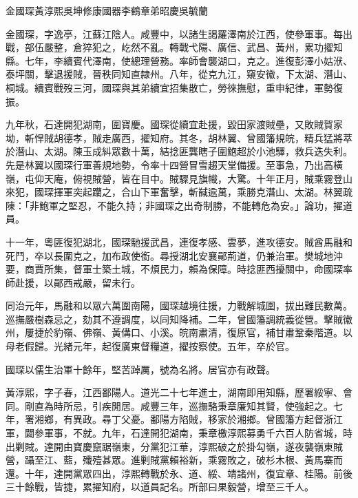 
\begin{pinyinscope}
金國琛黃淳熙吳坤修康國器李鶴章弟昭慶吳毓蘭

金國琛，字逸亭，江蘇江陰人。咸豐中，以諸生謁羅澤南於江西，使參軍事。每出戰，部伍嚴整，倉猝犯之，屹然不亂。轉戰弋陽、廣信、武昌、黃州，累功擢知縣。七年，李續賓代澤南，使總理營務。率師會襲湖口，克之。進復彭澤小姑洑、泰坪關，擊退援賊，晉秩同知直隸州。八年，從克九江，窺安徽，下太湖、潛山、桐城。續賓戰歿三河，國琛與其弟續宜招集散亡，勞徠撫慰，重申紀律，軍勢復振。

九年秋，石達開犯湖南，圍寶慶。國琛從續宜赴援，毀田家渡賊壘，又敗賊賀家坳，斬悍賊胡德孝，賊走廣西，擢知府。其冬，胡林翼、曾國籓規皖，精兵猛將萃於潛山、太湖。陳玉成糾眾數十萬，結捻匪龔瞎子圍鮑超於小池驛，救兵迭失利。先是林翼以國琛行軍善規地勢，令率十四營冒雪趨天堂備援。至事急，乃出高橫嶺，屯仰天庵，俯視賊營，皆在目中。賊驟見旗幟，大驚。十年正月，賊乘霧登山來犯，國琛揮軍突起躪之，合山下軍奮擊，斬馘逾萬，乘勝克潛山、太湖。林翼疏陳：「非鮑軍之堅忍，不能久持；非國琛之出奇制勝，不能轉危為安。」論功，擢道員。

十一年，粵匪復犯湖北，國琛馳援武昌，連復孝感、雲夢，進攻德安。賊酋馬融和死鬥，卒以長圍克之，加布政使銜。尋授湖北安襄鄖荊道，仍兼治軍。樊城地沖要，商賈所集，督軍士築土城，不煩民力，賴為保障。時捻匪西擾關中，命國琛率師赴援，以鄖西戒嚴，留未行。

同治元年，馬融和以眾六萬圍南陽，國琛越境往援，力戰解城圍，拔出難民數萬。巡撫嚴樹森忌之，劾其不遵調度，以同知降補。二年，曾國籓調統義從營。擊賊徽州，屢捷於豹嶺、佛嶺、黃傋口、小溪。皖南肅清，復原官，補甘肅鞏秦階道。以母老假歸。光緒元年，起復廣東督糧道，擢按察使。五年，卒於官。

國琛以儒生治軍十餘年，堅苦踔厲，號為名將。居官亦有政聲。

黃淳熙，字子春，江西鄱陽人。道光二十七年進士，湖南即用知縣，歷署綏寧、會同。剛直為時所忌，引疾閒居。咸豐三年，巡撫駱秉章廉知其賢，使強起之。七年，署湘鄉，有異政。尋丁父憂。鄱陽方陷賊，移家於湘鄉。曾國籓方起督浙江軍，闢參軍事，不就。九年，石達開犯湖南，秉章檄淳熙募勇千六百人防省城，時出剿賊。達開由寶慶竄踞嶺東，分黨犯江華，淳熙破之於掛勾嶺，遂夜襲嶺東賊營，躡至江、藍，殲殪甚眾。進剿賊黨賴裕新，乘霧敗之，破杉木根、黃馬寨而還。十年，達開黨眾四出，淳熙轉戰於永、道、綏、靖諸州，復宜章、桂陽。前後三十餘戰，皆捷，累擢知府，以道員記名。所部曰果毅營，增至三千人。


\end{pinyinscope}
